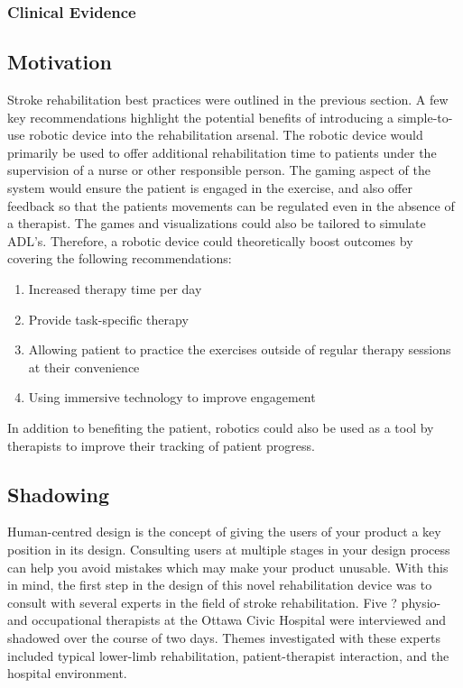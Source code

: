 \documentclass[12pt]{article}
\begin{document}
	\subsubsection{Clinical Evidence}
%
%

	\subsection{Motivation} 
Stroke rehabilitation best practices were outlined in the previous section. A few key recommendations highlight the potential benefits of introducing a simple-to-use robotic device into the rehabilitation arsenal. The robotic device would primarily be used to offer additional rehabilitation time to patients under the supervision of a nurse or other responsible person. The gaming aspect of the system would ensure the patient is engaged in the exercise, and also offer feedback so that the patients movements can be regulated even in the absence of a therapist. The games and visualizations could also be tailored to simulate ADL's. Therefore, a robotic device could theoretically boost outcomes by covering the following recommendations:
\begin{enumerate}
	\item Increased therapy time per day 
	\item Provide task-specific therapy
	\item Allowing patient to practice the exercises outside of regular therapy sessions at their convenience 
	\item Using immersive technology to improve engagement 
\end{enumerate}
In addition to benefiting the patient, robotics could also be used as a tool by therapists to improve their tracking of patient progress. 

	\subsection{Shadowing}
%
	
	
	Human-centred design is the concept of giving the users of your product a key position in its design. Consulting users at multiple stages in your design process can help you avoid mistakes which may make your product unusable. With this in mind, the first step in the design of this novel rehabilitation device was to consult with several experts in the field of stroke rehabilitation. Five ? physio- and occupational therapists at the Ottawa Civic Hospital were interviewed and shadowed over the course of two days. Themes investigated with these experts included typical lower-limb rehabilitation, patient-therapist interaction, and the hospital environment. 
	
\end{document}

